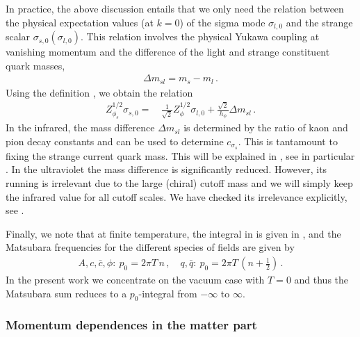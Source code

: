 \documentclass[aps,twocolumn,prd,superscriptaddress]{revtex4-2}
\begin{document}
In practice, the above discussion entails that we only need the relation between the physical expectation values (at $k=0$) of the sigma mode $\sigma_{l,0}$ and the strange scalar $\sigma_{s,0}(\sigma_{l,0})$. This relation involves the physical Yukawa coupling at vanishing momentum and the difference of the light and strange constituent quark masses, 
%
\begin{align} 
\Delta m_{sl} = m_s-m_l\,. 
\label{eq:Deltamsl}
\end{align}
%
Using the definition , we obtain the relation
%
\begin{align}
Z_{\phi_s}^{1/2}	\sigma_{s,{0}} =&\,  \frac{1}{\sqrt{2} }
	Z_\phi^{1/2} \sigma_{l,{0}} +
	\frac{\sqrt{2}}{h_\phi} \Delta m_{sl}\,.
	\label{eq:sigmas-sigma2}
\end{align}
%
In the infrared, the mass difference $\Delta m_{sl}$ is determined by the ratio of kaon and pion decay constants and can be used to determine $c_{\sigma_s}$. This is tantamount to fixing the strange current quark mass. This will be explained in , see in particular . In the ultraviolet the mass difference is significantly reduced. However, its running is irrelevant due to the large (chiral) cutoff mass and we will simply keep the infrared value for all cutoff scales. We have checked its irrelevance explicitly, see . 

Finally, we note that at finite temperature, the integral in  is given in , and the Matsubara frequencies for the different species of fields are given by 
%
\begin{align}
	A,c,\bar c,\phi:\  p_0= 2 \pi T \,n\,,\quad q,\bar q:\  p_0= 2 \pi T \,\left( n+\frac12\right)\,.
	\label{eq:AllMatsubaras}
\end{align}
% 
In the present work we concentrate on the vacuum case with $T=0$ and thus the Matsubara sum reduces to a $p_0$-integral from $-\infty$ to $\infty$. 


\subsubsection{Momentum dependences in the matter part} 
\label{sec:DerMatter}
\end{document}

